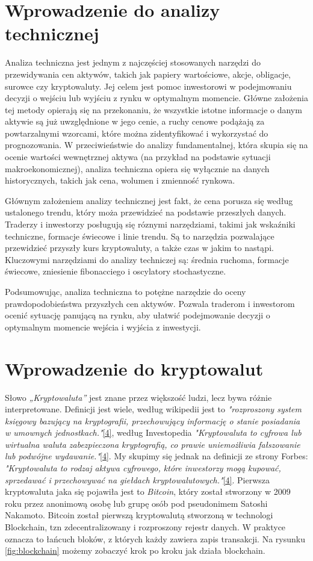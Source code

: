 \documentclass[12pt,a4paper,twoside, inzynierska]{pwr_wmat_praca_dyplomowa}
\theoremstyle{plain}
\numberwithin{theorem}{chapter}
\theoremstyle{definition}
\numberwithin{theorem}{chapter}
\begin{document}
	\section{Wprowadzenie do analizy technicznej}
	Analiza techniczna jest jednym z najczęściej stosowanych narzędzi do przewidywania cen aktywów, takich jak papiery wartościowe, akcje, obligacje, surowce czy kryptowaluty. Jej celem jest pomoc inwestorowi w podejmowaniu decyzji o wejściu lub wyjściu z rynku w optymalnym momencie. Główne założenia tej metody opierają się na przekonaniu, że wszystkie istotne informacje o danym aktywie są już uwzględnione w jego cenie, a ruchy cenowe podążają za powtarzalnymi wzorcami, które można zidentyfikować i wykorzystać do prognozowania. W przeciwieństwie do analizy fundamentalnej, która skupia się na ocenie wartości wewnętrznej aktywa (na przykład na podstawie sytuacji makroekonomicznej), analiza techniczna opiera się wyłącznie na danych historycznych, takich jak cena, wolumen i zmienność rynkowa.

	Głównym założeniem analizy technicznej jest fakt, że cena porusza się według ustalonego trendu, który moża przewidzieć na podstawie przeszłych danych. Traderzy i inwestorzy posługują się róznymi narzędziami, takimi jak wskaźniki techniczne, formacje świecowe i linie trendu. Są to narzędzia pozwalające przewidzieć przyszły kurs kryptowaluty, a także czas w jakim to nastąpi. Kluczowymi narzędziami do analizy techniczej są: średnia ruchoma, formacje świecowe, zniesienie fibonacciego i oscylatory stochastyczne. 
	
	Podsumowując, analiza techniczna to potężne narzędzie do oceny prawdopodobieństwa przyszłych cen aktywów. Pozwala traderom i inwestorom ocenić sytuację panującą na rynku, aby ułatwić podejmowanie decyzji o optymalnym momencie wejścia i wyjścia z inwestycji.

	\section{Wprowadzenie do kryptowalut}
	 Słowo \emph{„Kryptowaluta”} jest znane przez większość ludzi, lecz bywa różnie interpretowane. Definicji jest wiele, według wikipedii jest to \emph{ "rozproszony system księgowy bazujący na kryptografii, przechowujący informację o stanie posiadania w umownych jednostkach."}\hyperref[info4]{[4]}, według Investopedia \emph{"Kryptowaluta to cyfrowa lub wirtualna waluta zabezpieczona kryptografią, co prawie uniemożliwia fałszowanie lub podwójne wydawanie."}\hyperref[info4]{[4]}. My skupimy się jednak na definicji ze strony Forbes: \emph{"Kryptowaluta to rodzaj aktywa cyfrowego, które inwestorzy mogą kupować, sprzedawać i przechowywać na giełdach kryptowalutowych."}\hyperref[info4]{[4]}. Pierwsza kryptowaluta jaka się pojawiła jest to \emph{Bitcoin}, który został stworzony w 2009 roku przez anonimową osobę lub grupę osób pod pseudonimem Satoshi Nakamoto. Bitcoin został pierwszą kryptowalutą stworzoną w technologi Blockchain, tzn zdecentralizowany i rozproszony rejestr danych. W praktyce oznacza to łańcuch bloków, z których każdy zawiera zapis transakcji. Na rysunku \ref{fig:blockchain} możemy zobaczyć krok po kroku jak działa blockchain.
	
\end{document}
